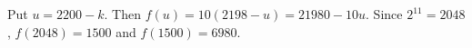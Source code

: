 Put $u=2200-k$. Then $f(u)=10(2198-u)=21980-10u$. Since $2^{11}=2048$, $f(2048)=1500$ and $f(1500)=\boxed{6980}$.
